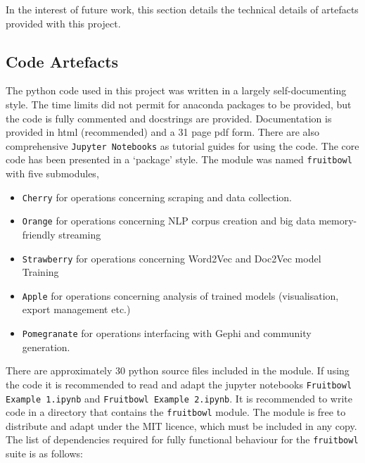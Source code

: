 In the interest of future work, this section details the technical details of artefacts provided with this project.

\subsection{Code Artefacts}
The python code used in this project was written in a largely self-documenting style. The time limits did not permit for anaconda packages to be provided, but the code is fully commented and docstrings are provided. Documentation is provided in html (recommended) and a 31 page pdf form. There are also comprehensive  \texttt{Jupyter Notebooks} as tutorial guides for using the code\cite{jupyter}. The core code has been presented in a `package' style.  The module was named \texttt{fruitbowl} with five submodules,
\begin{itemize}
\itemsep-.6em
\item \texttt{Cherry} for operations concerning scraping and data collection.
\item \texttt{Orange} for operations concerning NLP corpus creation and big data memory-friendly streaming
\item \texttt{Strawberry} for operations concerning Word2Vec and Doc2Vec model Training
\item \texttt{Apple} for operations concerning analysis of trained models (visualisation, export management etc.)
\item \texttt{Pomegranate} for operations interfacing with Gephi and community generation.
\end{itemize} 
There are approximately 30 python source files included in the module. If using the code it is recommended to read and adapt the jupyter notebooks \texttt{Fruitbowl Example 1.ipynb} and \texttt{Fruitbowl Example 2.ipynb}. It is recommended to write code in a directory that contains the \texttt{fruitbowl} module. The module is free to distribute and adapt under the MIT licence, which must be included in any copy.  The list of dependencies required for fully functional behaviour for the \texttt{fruitbowl} suite is as follows:
